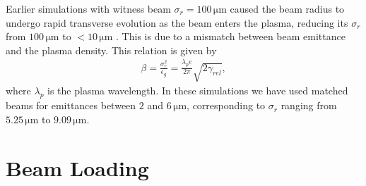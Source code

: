 \documentclass[aps,prstab,reprint,amsmath,amssymb,groupedaddress]{revtex4-1}
\newcommand{\unit}[1]{\,\mathrm{#1}}
\begin{document}
Earlier simulations with witness beam $\sigma_{r} = 100\unit{\mu m}$ caused the beam radius to undergo rapid transverse
evolution as the beam enters the plasma, reducing its $\sigma_{r}$ from $100\unit{\mu m}$ to $< 10\unit{\mu m}$
\cite{berglyd_olsen:2016}. This is due to a mismatch between beam emittance and the plasma density. This relation is
given by
\begin{align}
    \beta = \frac{\sigma_r^2}{\epsilon_g} = \frac{\lambda_pe}{2\pi}\sqrt{2\gamma_{rel}}, \label{EQ:Matched}
\end{align}
where $\lambda_{p}$ is the plasma wavelength. In these simulations we have used matched beams for emittances between
$2$ and $6\unit{\mu m}$, corresponding to $\sigma_{r}$ ranging from $5.25\unit{\mu m}$ to $9.09\unit{\mu m}$.

\section[\label{S:BL}]{Beam Loading}
\end{document}
